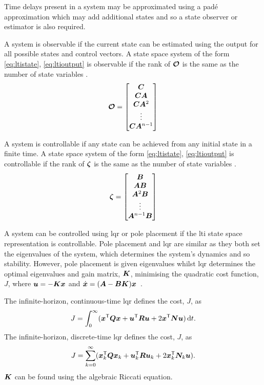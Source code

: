 Time delays present in a system may be approximated using a padé approximation which may add additional states and so a state observer or estimator is also required.

A system is observable if the current state can be estimated using the output for all possible states and control vectors.
A state space system of the form \eqref{eq:ltistate}, \eqref{eq:ltioutput} is observable if the rank of $\bm{\mathcal{O}}$ is the same as the number of state variables \cite{fri2005}.
\begin{align}
    \bm{\mathcal{O}} = \begin{bmatrix}
        \bm C \\
        \bm C \bm A \\
        \bm C \bm A^2 \\
        \vdots \\
        \bm C \bm A^{n-1}
    \end{bmatrix}
\end{align}

A system is controllable if any state can be achieved from any initial state in a finite time.
A state space system of the form \eqref{eq:ltistate}, \eqref{eq:ltioutput} is controllable if the rank of $\bm \zeta$ is the same as the number of state variables \cite{fri2005}.
\begin{align}
    \bm \zeta = \begin{bmatrix}
        \bm B \\
        \bm A \bm B \\
        \bm A^2 \bm B \\
        \vdots \\
        \bm A^{n-1} \bm B
    \end{bmatrix}
\end{align}

A system can be controlled using \gls{lqr} or pole placement if the \gls{lti} state space representation is controllable.
Pole placement and \gls{lqr} are similar as they both set the eigenvalues of the system, which determines the system's dynamics and so stability. 
However, pole placement is given eigenvalues whilst \gls{lqr} determines the optimal eigenvalues and gain matrix, $\bm K$, minimising the quadratic cost function, $J$, where $\bm u = -\bm K \bm x$ and $\dot{ \bm x } = (\bm A - \bm B \bm K) \bm x$~\cite{fri2005}.

The infinite-horizon, continuous-time \gls{lqr} defines the cost, $J$, as \begin{align}
    J = \int_{0}^{\infty} (\bm x^\mathsf{T} \bm Q \bm x + \bm u^\mathsf{T} \bm R \bm u + 2 \bm x^\mathsf{T} \bm N \bm u) \,\mathrm{d}t.
\end{align}
The infinite-horizon, discrete-time \gls{lqr} defines the cost, $J$, as 
\begin{align}
    J = \sum_{k = 0}^{\infty} (\bm x_k^\mathsf{T} \bm Q \bm x_k + \bm u_k^\mathsf{T} \bm R \bm u_k + 2 \bm x_k^\mathsf{T} \bm N_k \bm u).
\end{align}
$\bm K$ can be found using the algebraic Riccati equation.

